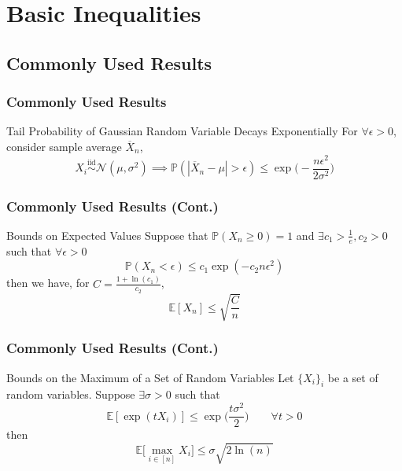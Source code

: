 \documentclass{beamer}
\begin{document}
\section{Basic Inequalities} 

\subsection{Commonly Used Results} 
\begin{frame}
\frametitle{Commonly Used Results} 

\begin{block}{Tail Probability of Gaussian Random Variable Decays Exponentially}
For $\forall \epsilon > 0$, consider sample average $\overline{X}_n$, 
$$ X_i \stackrel{\text{iid}}{\sim} \mathcal{N}(\mu, \sigma^2) \implies \mathbb{P}(|\overline{X}_n - \mu| > \epsilon) \leq \exp \bigg( -\frac{n\epsilon^2}{2\sigma^2} \bigg) $$
\end{block}

\end{frame}


\begin{frame}
\frametitle{Commonly Used Results (Cont.)} 

\begin{block}{Bounds on Expected Values}
Suppose that $\mathbb{P}(X_n \geq 0) = 1$ and $\exists c_1 > \frac{1}{e}, c_2 >0$ such that $\forall \epsilon >0$
$$ \mathbb{P}(X_n < \epsilon) \leq c_1 \exp(-c_2 n \epsilon^2) $$
then we have, for $C = \frac{1 + \ln(c_1)}{c_2}$, 
$$ \mathbb{E}[X_n] \leq \sqrt{\frac{C}{n}} $$
\end{block}

\end{frame}


\begin{frame}
\frametitle{Commonly Used Results (Cont.)} 

\begin{block}{Bounds on the Maximum of a Set of Random Variables}
Let $\{X_i\}_i$ be a set of random variables. Suppose $\exists \sigma > 0$ such that 
$$ \mathbb{E}[ \exp(tX_i) ] \leq \exp\big( \frac{t\sigma^2}{2} \big) \qquad \forall t>0 $$
then 
$$ \mathbb{E} \bigg[ \max_{i \in [n]} X_i \bigg] \leq \sigma \sqrt{2 \ln(n)} $$
\end{block}

\end{frame}
\end{document}
